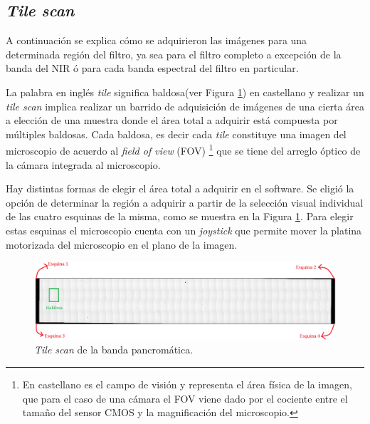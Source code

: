 \singlespacing
\subsection*{\textit{Tile scan}}

\hspace{0.5cm}A continuación se explica cómo se adquirieron las imágenes para una determinada región del filtro, ya sea para el filtro completo a excepción de la banda del NIR ó para cada banda espectral del filtro en particular.

La palabra en inglés \textit{tile} significa baldosa(ver Figura \ref{fig:tilescan}) en castellano y realizar un \textit{tile scan} implica realizar un barrido de adquisición de imágenes de una cierta área a elección de una muestra donde el área total a adquirir está compuesta por múltiples baldosas. Cada baldosa, es decir cada \textit{tile} constituye una imagen del microscopio de acuerdo al \textit{field of view} (FOV) \footnote{En castellano es el campo de visión y representa el área física de la imagen, que para el caso de una cámara el FOV viene dado por el cociente entre el tamaño del sensor CMOS y la magnificación del microscopio.} que se tiene del arreglo óptico de la cámara integrada al microscopio.

Hay distintas formas de elegir el área total a adquirir en el software. Se eligió la opción de determinar la región a adquirir a partir de la selección visual individual de las cuatro esquinas de la misma, como se muestra en la Figura \ref{fig:tilescan}. Para elegir estas esquinas el microscopio cuenta con un \textit{joystick} que permite mover la platina motorizada del microscopio en el plano de la imagen.

\begin{figure}[!h]
	\centering
	\includegraphics[width=1.0\textwidth]{Figs/cuantificaciondefectos/tilescan.png}
	\caption{\textit{Tile scan} de la banda pancromática.}
	\label{fig:tilescan}
\end{figure} 

